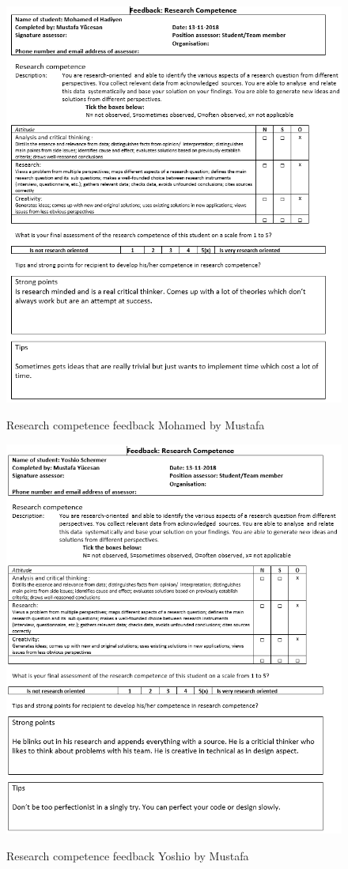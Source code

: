 \documentclass[12pt]{article}
\begin{document}
	\begin{figure}[p!]
		\centering
		\includegraphics[width=\columnwidth]{ResSklMohamed2.PNG}\\
		\caption{Research competence feedback Mohamed by Mustafa}
	\end{figure}
	\begin{figure}[p!]
		\centering
		\includegraphics[width=\columnwidth]{ResSklYoshio2.PNG}\\
		\caption{Research competence feedback Yoshio by Mustafa}
	\end{figure}
\end{document}
